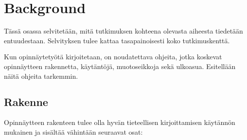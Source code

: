 \documentclass[english,12pt,a4paper,dvips]{article}
\begin{document}
\section{Background}

Tässä osassa selvitetään, mitä tutkimuksen kohteena olevasta
aiheesta tiedetään entuudestaan. Selvityksen tulee kattaa
tasapainoisesti koko tutkimuskenttä. 

Kun opinnäytetyötä kirjoitetaan, on noudatettava 
ohjeita, jotka koskevat opinnäytteen rakennetta,
käytäntöjä, muotoseikkoja sekä ulkoasua. Esitellään näitä
ohjeita tarkemmin.


\subsection*{Rakenne}

Opinnäytteen rakenteen tulee olla hyvän tieteellisen
kirjoittamisen käytännön mukainen ja sisältää vähintään seuraavat
osat:
\end{document}
